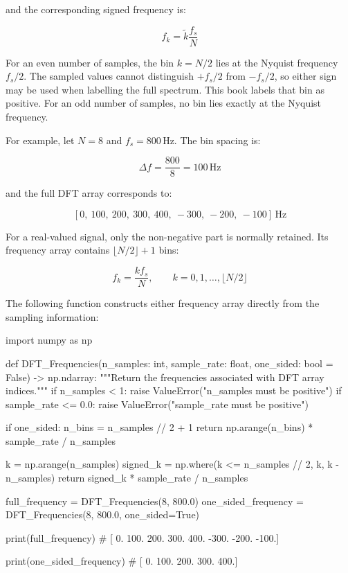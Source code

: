 and the corresponding signed frequency is:

\begin{equation}
    f_k = \widetilde{k}\frac{f_s}{N}
\end{equation}

For an even number of samples, the bin $ k=N/2 $ lies at the Nyquist
frequency $ f_s/2 $. The sampled values cannot distinguish $ +f_s/2 $ from
$ -f_s/2 $, so either sign may be used when labelling the full spectrum. This
book labels that bin as positive. For an odd number of samples, no bin lies
exactly at the Nyquist frequency.

For example, let $ N=8 $ and $ f_s=800\,\mathrm{Hz} $. The bin spacing is:

\begin{equation}
    \Delta f = \frac{800}{8}=100\,\mathrm{Hz}
\end{equation}

and the full DFT array corresponds to:

\begin{equation}
    \left[0,\ 100,\ 200,\ 300,\ 400,\ -300,\ -200,\ -100\right]\,\mathrm{Hz}
\end{equation}

For a real-valued signal, only the non-negative part is normally retained. Its
frequency array contains $ \lfloor N/2\rfloor+1 $ bins:

\begin{equation}
    f_k = \frac{k f_s}{N},
    \qquad k=0,1,\dots,\lfloor N/2\rfloor
\end{equation}

The following function constructs either frequency array directly from the
sampling information:

\begin{python}
import numpy as np


def DFT_Frequencies(n_samples: int,
                    sample_rate: float,
                    one_sided: bool = False) -> np.ndarray:
    """Return the frequencies associated with DFT array indices."""
    if n_samples < 1:
        raise ValueError("n_samples must be positive")
    if sample_rate <= 0.0:
        raise ValueError("sample_rate must be positive")

    if one_sided:
        n_bins = n_samples // 2 + 1
        return np.arange(n_bins) * sample_rate / n_samples

    k = np.arange(n_samples)
    signed_k = np.where(k <= n_samples // 2, k, k - n_samples)
    return signed_k * sample_rate / n_samples


full_frequency = DFT_Frequencies(8, 800.0)
one_sided_frequency = DFT_Frequencies(8, 800.0, one_sided=True)

print(full_frequency)
# [   0.  100.  200.  300.  400. -300. -200. -100.]

print(one_sided_frequency)
# [  0. 100. 200. 300. 400.]
\end{python}

